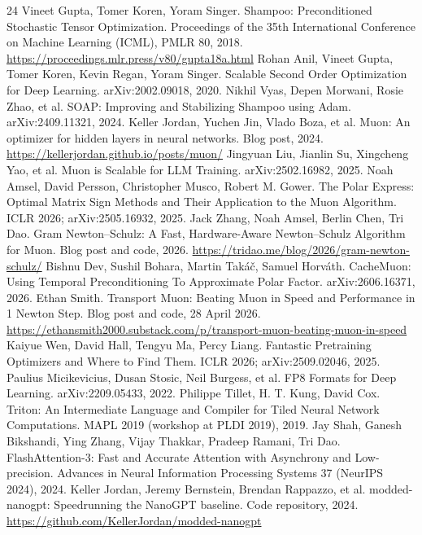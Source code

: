 \documentclass{article}
\begin{document}
\clearpage
\label{pg:refs}\begin{thebibliography}{24}\small
{} Vineet Gupta, Tomer Koren, Yoram Singer. Shampoo: Preconditioned Stochastic Tensor Optimization. Proceedings of the 35th International Conference on Machine Learning (ICML), PMLR 80, 2018. \url{https://proceedings.mlr.press/v80/gupta18a.html}
 Rohan Anil, Vineet Gupta, Tomer Koren, Kevin Regan, Yoram Singer. Scalable Second Order Optimization for Deep Learning. arXiv:2002.09018, 2020.
 Nikhil Vyas, Depen Morwani, Rosie Zhao, et al. SOAP: Improving and Stabilizing Shampoo using Adam. arXiv:2409.11321, 2024.
 Keller Jordan, Yuchen Jin, Vlado Boza, et al. Muon: An optimizer for hidden layers in neural networks. Blog post, 2024. \url{https://kellerjordan.github.io/posts/muon/}
 Jingyuan Liu, Jianlin Su, Xingcheng Yao, et al. Muon is Scalable for LLM Training. arXiv:2502.16982, 2025.
 Noah Amsel, David Persson, Christopher Musco, Robert M. Gower. The Polar Express: Optimal Matrix Sign Methods and Their Application to the Muon Algorithm. ICLR 2026; arXiv:2505.16932, 2025.
 Jack Zhang, Noah Amsel, Berlin Chen, Tri Dao. Gram Newton--Schulz: A Fast, Hardware-Aware Newton--Schulz Algorithm for Muon. Blog post and code, 2026. \url{https://tridao.me/blog/2026/gram-newton-schulz/}
 Bishnu Dev, Sushil Bohara, Martin Tak\'a\v{c}, Samuel Horv\'ath. CacheMuon: Using Temporal Preconditioning To Approximate Polar Factor. arXiv:2606.16371, 2026.
 Ethan Smith. Transport Muon: Beating Muon in Speed and Performance in 1 Newton Step. Blog post and code, 28 April 2026. \url{https://ethansmith2000.substack.com/p/transport-muon-beating-muon-in-speed}
 Kaiyue Wen, David Hall, Tengyu Ma, Percy Liang. Fantastic Pretraining Optimizers and Where to Find Them. ICLR 2026; arXiv:2509.02046, 2025.
 Paulius Micikevicius, Dusan Stosic, Neil Burgess, et al. FP8 Formats for Deep Learning. arXiv:2209.05433, 2022.
 Philippe Tillet, H. T. Kung, David Cox. Triton: An Intermediate Language and Compiler for Tiled Neural Network Computations. MAPL 2019 (workshop at PLDI 2019), 2019.
 Jay Shah, Ganesh Bikshandi, Ying Zhang, Vijay Thakkar, Pradeep Ramani, Tri Dao. FlashAttention-3: Fast and Accurate Attention with Asynchrony and Low-precision. Advances in Neural Information Processing Systems 37 (NeurIPS 2024), 2024.
 Keller Jordan, Jeremy Bernstein, Brendan Rappazzo, et al. modded-nanogpt: Speedrunning the NanoGPT baseline. Code repository, 2024. \url{https://github.com/KellerJordan/modded-nanogpt}

\end{thebibliography}
\end{document}
